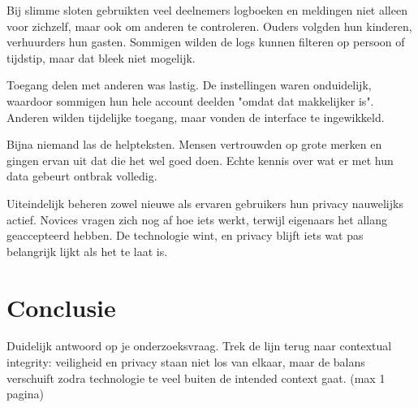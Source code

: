 \documentclass[nonacm, sigconf]{acmart}
\begin{document}
    Bij slimme sloten gebruikten veel deelnemers logboeken en meldingen niet alleen voor zichzelf, maar ook om anderen te controleren.
    Ouders volgden hun kinderen, verhuurders hun gasten.
    Sommigen wilden de logs kunnen filteren op persoon of tijdstip, maar dat bleek niet mogelijk.

    Toegang delen met anderen was lastig.
    De instellingen waren onduidelijk, waardoor sommigen hun hele account deelden "omdat dat makkelijker is".
    Anderen wilden tijdelijke toegang, maar vonden de interface te ingewikkeld.

    Bijna niemand las de helpteksten.
    Mensen vertrouwden op grote merken en gingen ervan uit dat die het wel goed doen.
    Echte kennis over wat er met hun data gebeurt ontbrak volledig.

    Uiteindelijk beheren zowel nieuwe als ervaren gebruikers hun privacy nauwelijks actief.
    Novices vragen zich nog af hoe iets werkt, terwijl eigenaars het allang geaccepteerd hebben.
    De technologie wint, en privacy blijft iets wat pas belangrijk lijkt als het te laat is.

    \section{Conclusie}
    Duidelijk antwoord op je onderzoeksvraag.
    Trek de lijn terug naar contextual integrity: veiligheid en privacy staan niet los van elkaar, maar de balans verschuift zodra technologie te veel buiten de intended context gaat. (max 1 pagina)

    \printbibliography

    \balance %
\end{document}

